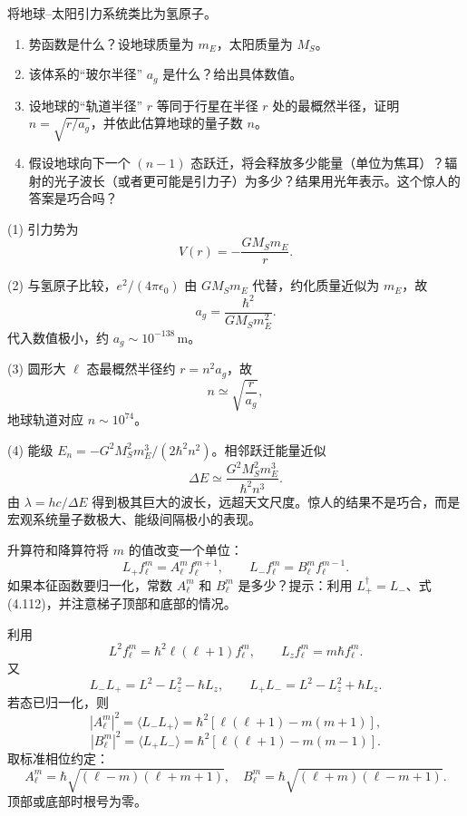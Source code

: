 \begin{question}
将地球--太阳引力系统类比为氢原子。
\begin{enumerate}
\item 势函数是什么？设地球质量为 $m_E$，太阳质量为 $M_S$。
\item 该体系的“玻尔半径” $a_g$ 是什么？给出具体数值。
\item 设地球的“轨道半径” $r$ 等同于行星在半径 $r$ 处的最概然半径，证明 $n=\sqrt{r/a_g}$，并依此估算地球的量子数 $n$。
\item 假设地球向下一个 $(n-1)$ 态跃迁，将会释放多少能量（单位为焦耳）？辐射的光子波长（或者更可能是引力子）为多少？结果用光年表示。这个惊人的答案是巧合吗？
\end{enumerate}
\end{question}
\begin{solution}

(1) 引力势为
\[
V(r)=-\frac{GM_Sm_E}{r}.
\]

(2) 与氢原子比较，$e^2/(4\pi\epsilon_0)$ 由 $GM_Sm_E$ 代替，约化质量近似为 $m_E$，故
\[
a_g=\frac{\hbar^2}{G M_S m_E^2}.
\]
代入数值极小，约 $a_g\sim 10^{-138}\,\mathrm m$。

(3) 圆形大 $\ell$ 态最概然半径约 $r=n^2a_g$，故
\[
n\simeq\sqrt{\frac{r}{a_g}},
\]
地球轨道对应 $n\sim 10^{74}$。

(4) 能级 $E_n=-G^2M_S^2m_E^3/(2\hbar^2n^2)$。相邻跃迁能量近似
\[
\Delta E\simeq \frac{G^2M_S^2m_E^3}{\hbar^2n^3}.
\]
由 $\lambda=hc/\Delta E$ 得到极其巨大的波长，远超天文尺度。惊人的结果不是巧合，而是宏观系统量子数极大、能级间隔极小的表现。

\end{solution}

\begin{question}
升算符和降算符将 $m$ 的值改变一个单位：
\[
L_+f_\ell^m=A_\ell^m f_\ell^{m+1},\qquad
L_-f_\ell^m=B_\ell^m f_\ell^{m-1}.
\]
如果本征函数要归一化，常数 $A_\ell^m$ 和 $B_\ell^m$ 是多少？提示：利用 $L_+^\dagger=L_-$、式 (4.112)，并注意梯子顶部和底部的情况。

\par\smallskip
{}

\end{question}
\begin{solution}

利用
\[
L^2f_\ell^m=\hbar^2\ell(\ell+1)f_\ell^m,
\qquad L_zf_\ell^m=m\hbar f_\ell^m.
\]
又
\[
L_-L_+=L^2-L_z^2-\hbar L_z,
\qquad
L_+L_-=L^2-L_z^2+\hbar L_z.
\]
若态已归一化，则
\[
|A_\ell^m|^2=\langle L_-L_+\rangle
=\hbar^2[\ell(\ell+1)-m(m+1)],
\]
\[
|B_\ell^m|^2=\langle L_+L_-\rangle
=\hbar^2[\ell(\ell+1)-m(m-1)].
\]
取标准相位约定：
\[
A_\ell^m=\hbar\sqrt{(\ell-m)(\ell+m+1)},
\quad
B_\ell^m=\hbar\sqrt{(\ell+m)(\ell-m+1)}.
\]
顶部或底部时根号为零。

\end{solution}

